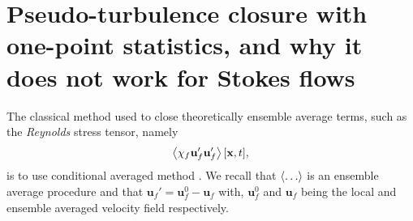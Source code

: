 \section{Pseudo-turbulence closure with one-point statistics, and why it does not work for Stokes flows}

The classical method used to close theoretically ensemble average terms, such as the \textit{Reynolds} stress tensor, namely 
\begin{equation*}
    \left<\chi_f \textbf{u}_f' \textbf{u}_f'\right>[\textbf{x},t],
\end{equation*} 
is to use conditional averaged method \citet{van1998pseudo,zhang1994ensemble}.
We recall that $\left<\ldots\right>$ is an ensemble average procedure and that $\textbf{u}_f' = \textbf{u}_f^0 - \textbf{u}_f$ with,  $\textbf{u}_f^0$ and $\textbf{u}_f$ being the local and ensemble averaged velocity field respectively.

